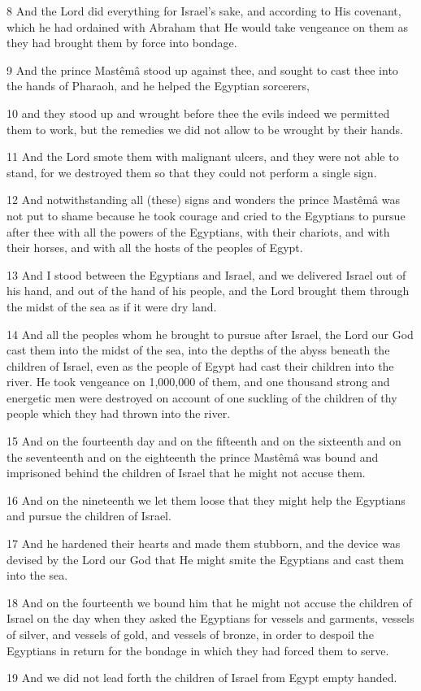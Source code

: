 \par 8 And the Lord did everything for Israel's sake, and according to His covenant, which he had ordained with Abraham that He would take vengeance on them as they had brought them by force into bondage.
\par 9 And the prince Mastêmâ stood up against thee, and sought to cast thee into the hands of Pharaoh, and he helped the Egyptian sorcerers,
\par 10 and they stood up and wrought before thee the evils indeed we permitted them to work, but the remedies we did not allow to be wrought by their hands.
\par 11 And the Lord smote them with malignant ulcers, and they were not able to stand, for we destroyed them so that they could not perform a single sign.
\par 12 And notwithstanding all (these) signs and wonders the prince Mastêmâ was not put to shame because he took courage and cried to the Egyptians to pursue after thee with all the powers of the Egyptians, with their chariots, and with their horses, and with all the hosts of the peoples of Egypt.
\par 13 And I stood between the Egyptians and Israel, and we delivered Israel out of his hand, and out of the hand of his people, and the Lord brought them through the midst of the sea as if it were dry land.
\par 14 And all the peoples whom he brought to pursue after Israel, the Lord our God cast them into the midst of the sea, into the depths of the abyss beneath the children of Israel, even as the people of Egypt had cast their children into the river. He took vengeance on 1,000,000 of them, and one thousand strong and energetic men were destroyed on account of one suckling of the children of thy people which they had thrown into the river.
\par 15 And on the fourteenth day and on the fifteenth and on the sixteenth and on the seventeenth and on the eighteenth the prince Mastêmâ was bound and imprisoned behind the children of Israel that he might not accuse them.
\par 16 And on the nineteenth we let them loose that they might help the Egyptians and pursue the children of Israel.
\par 17 And he hardened their hearts and made them stubborn, and the device was devised by the Lord our God that He might smite the Egyptians and cast them into the sea.
\par 18 And on the fourteenth we bound him that he might not accuse the children of Israel on the day when they asked the Egyptians for vessels and garments, vessels of silver, and vessels of gold, and vessels of bronze, in order to despoil the Egyptians in return for the bondage in which they had forced them to serve.
\par 19 And we did not lead forth the children of Israel from Egypt empty handed.

